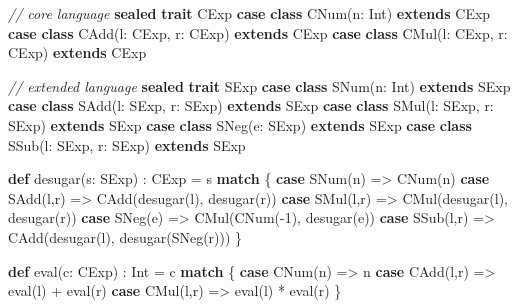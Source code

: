 \documentclass[]{article}
\newenvironment{Shaded}{}{}
\newcommand{\CommentTok}[1]{\textcolor[rgb]{0.38,0.63,0.69}{\textit{#1}}}
\newcommand{\DecValTok}[1]{\textcolor[rgb]{0.25,0.63,0.44}{#1}}
\newcommand{\FunctionTok}[1]{\textcolor[rgb]{0.02,0.16,0.49}{#1}}
\newcommand{\KeywordTok}[1]{\textcolor[rgb]{0.00,0.44,0.13}{\textbf{#1}}}
\newcommand{\NormalTok}[1]{#1}
\begin{document}
\begin{Shaded}
\begin{Highlighting}[]
\CommentTok{// core language}
\KeywordTok{sealed} \KeywordTok{trait}\NormalTok{ CExp}
\KeywordTok{case} \KeywordTok{class} \FunctionTok{CNum}\NormalTok{(n: Int) }\KeywordTok{extends}\NormalTok{ CExp }
\KeywordTok{case} \KeywordTok{class} \FunctionTok{CAdd}\NormalTok{(l: CExp, r: CExp) }\KeywordTok{extends}\NormalTok{ CExp}
\KeywordTok{case} \KeywordTok{class} \FunctionTok{CMul}\NormalTok{(l: CExp, r: CExp) }\KeywordTok{extends}\NormalTok{ CExp}

\CommentTok{// extended language}
\KeywordTok{sealed} \KeywordTok{trait}\NormalTok{ SExp}
\KeywordTok{case} \KeywordTok{class} \FunctionTok{SNum}\NormalTok{(n: Int) }\KeywordTok{extends}\NormalTok{ SExp}
\KeywordTok{case} \KeywordTok{class} \FunctionTok{SAdd}\NormalTok{(l: SExp, r: SExp) }\KeywordTok{extends}\NormalTok{ SExp}
\KeywordTok{case} \KeywordTok{class} \FunctionTok{SMul}\NormalTok{(l: SExp, r: SExp) }\KeywordTok{extends}\NormalTok{ SExp}
\KeywordTok{case} \KeywordTok{class} \FunctionTok{SNeg}\NormalTok{(e: SExp) }\KeywordTok{extends}\NormalTok{ SExp}
\KeywordTok{case} \KeywordTok{class} \FunctionTok{SSub}\NormalTok{(l: SExp, r: SExp) }\KeywordTok{extends}\NormalTok{ SExp}

\KeywordTok{def} \FunctionTok{desugar}\NormalTok{(s: SExp) : CExp = s }\KeywordTok{match}\NormalTok{ \{ }
  \KeywordTok{case} \FunctionTok{SNum}\NormalTok{(n) =\textgreater{} }\FunctionTok{CNum}\NormalTok{(n)}
  \KeywordTok{case} \FunctionTok{SAdd}\NormalTok{(l,r) =\textgreater{} }\FunctionTok{CAdd}\NormalTok{(}\FunctionTok{desugar}\NormalTok{(l), }\FunctionTok{desugar}\NormalTok{(r))}
  \KeywordTok{case} \FunctionTok{SMul}\NormalTok{(l,r) =\textgreater{} }\FunctionTok{CMul}\NormalTok{(}\FunctionTok{desugar}\NormalTok{(l), }\FunctionTok{desugar}\NormalTok{(r)) }
  \KeywordTok{case} \FunctionTok{SNeg}\NormalTok{(e)   =\textgreater{} }\FunctionTok{CMul}\NormalTok{(}\FunctionTok{CNum}\NormalTok{({-}}\DecValTok{1}\NormalTok{), }\FunctionTok{desugar}\NormalTok{(e))}
  \KeywordTok{case} \FunctionTok{SSub}\NormalTok{(l,r) =\textgreater{} }\FunctionTok{CAdd}\NormalTok{(}\FunctionTok{desugar}\NormalTok{(l), }\FunctionTok{desugar}\NormalTok{(}\FunctionTok{SNeg}\NormalTok{(r)))}
\NormalTok{\}}

\KeywordTok{def} \FunctionTok{eval}\NormalTok{(c: CExp) : Int = c }\KeywordTok{match}\NormalTok{ \{}
  \KeywordTok{case} \FunctionTok{CNum}\NormalTok{(n) =\textgreater{} n}
  \KeywordTok{case} \FunctionTok{CAdd}\NormalTok{(l,r) =\textgreater{} }\FunctionTok{eval}\NormalTok{(l) + }\FunctionTok{eval}\NormalTok{(r)}
  \KeywordTok{case} \FunctionTok{CMul}\NormalTok{(l,r) =\textgreater{} }\FunctionTok{eval}\NormalTok{(l) * }\FunctionTok{eval}\NormalTok{(r)}
\NormalTok{\}}


\end{Highlighting}
\end{Shaded}
\end{document}

